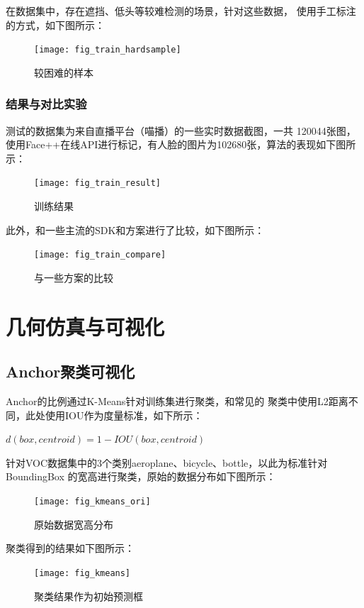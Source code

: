 \documentclass[a4paper, notitlepage]{article}
\begin{document}
在数据集中，存在遮挡、低头等较难检测的场景，针对这些数据，
使用手工标注的方式，如下图所示：

\begin{figure}[H]
    \centering
    \texttt{[image: fig\_train\_hardsample]}
    \caption{较困难的样本}
    \label{fig:example}
\end{figure}

\subsubsection{结果与对比实验}
测试的数据集为来自直播平台（喵播）的一些实时数据截图，一共
120044张图，使用Face++在线API进行标记，有人脸的图片为102680张，算法的表现如下图所示：
\begin{figure}[H]
    \centering
    \texttt{[image: fig\_train\_result]}
    \caption{训练结果}
    \label{fig:example}
\end{figure}

此外，和一些主流的SDK和方案进行了比较，如下图所示：

\begin{figure}[H]
    \centering
    \texttt{[image: fig\_train\_compare]}
    \caption{与一些方案的比较}
    \label{fig:example}
\end{figure}

\section{几何仿真与可视化}
\subsection{Anchor聚类可视化}
Anchor的比例通过K-Means针对训练集进行聚类，和常见的
聚类中使用L2距离不同，此处使用IOU作为度量标准，如下所示：

\(d(box,centroid)=1-IOU(box,centroid)\)


针对VOC数据集中的3个类别aeroplane、bicycle、bottle，以此为标准针对BoundingBox
的宽高进行聚类，原始的数据分布如下图所示：

\begin{figure}[H]
    \centering
    \texttt{[image: fig\_kmeans\_ori]}
    \caption{原始数据宽高分布}
    \label{fig:example}
\end{figure}

聚类得到的结果如下图所示：

\begin{figure}[H]
    \centering
    \texttt{[image: fig\_kmeans]}
    \caption{聚类结果作为初始预测框}
    \label{fig:example}
\end{figure}
\end{document}
